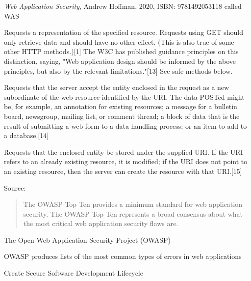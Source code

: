 \documentclass[Screen16to9,17pt]{foils}
\begin{document}

\emph{Web Application Security}, Andrew Hoffman, 2020, ISBN: 9781492053118 called WAS


\begin{list2}
\item [GET]
Requests a representation of the specified resource. Requests using GET should only retrieve data and should have no other effect. (This is also true of some other HTTP methods.)[1] The W3C has published guidance principles on this distinction, saying, "Web application design should be informed by the above principles, but also by the relevant limitations."[13] See safe methods below.
\item [POST]
Requests that the server accept the entity enclosed in the request as a new subordinate of the web resource identified by the URI. The data POSTed might be, for example, an annotation for existing resources; a message for a bulletin board, newsgroup, mailing list, or comment thread; a block of data that is the result of submitting a web form to a data-handling process; or an item to add to a database.[14]
\item [PUT]
Requests that the enclosed entity be stored under the supplied URI. If the URI refers to an already existing resource, it is modified; if the URI does not point to an existing resource, then the server can create the resource with that URI.[15]
\end{list2}

Source: 



\begin{quote}
The OWASP Top Ten provides a minimum standard for web application
security. The OWASP Top Ten represents a broad consensus about what
the most critical web application security flaws are.
\end{quote}

\begin{list1}
\item The Open Web Application Security Project (OWASP)
\item OWASP produces lists of the most common types of errors in web applications
\item {}
\item Create Secure Software Development Lifecycle
\end{list1}
\end{document}
